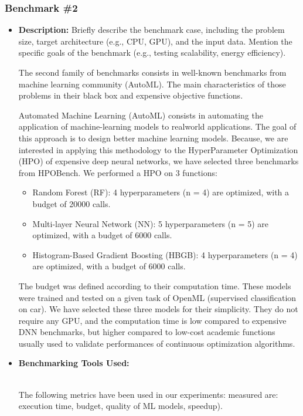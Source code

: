 \subsubsection{Benchmark \#2}
\begin{itemize}
\item \textbf{Description:} Briefly describe the benchmark case, including the problem size, target architecture (e.g., CPU, GPU), and the input data. Mention the specific goals of the benchmark (e.g., testing scalability, energy efficiency).

The second family of benchmarks consists in well-known benchmarks from machine learning community (AutoML). The main characteristics of those problems in their black box and expensive objective functions.

Automated Machine Learning (AutoML) consists in automating
the application of machine-learning models to realworld
applications. The goal of this approach is to design
better machine learning models. Because, we are interested
in applying this methodology to the HyperParameter Optimization
(HPO) of expensive deep neural networks, we
have selected three benchmarks from HPOBench. We
performed a HPO on 3 functions:
\begin{itemize}
\item Random Forest (RF): 4 hyperparameters (n = 4) are
optimized, with a budget of 20000 calls.
\item Multi-layer Neural Network (NN): 5 hyperparameters
(n = 5) are optimized, with a budget of 6000 calls.
\item Histogram-Based Gradient Boosting (HBGB): 4 hyperparameters
(n = 4) are optimized, with a budget of 6000 calls.
\end{itemize}

The budget was defined according to their computation time. These models were trained and tested on a given task of OpenML (supervised classification on car). We have selected these three models for their simplicity. They do not require any GPU, and the computation time is low compared to expensive DNN benchmarks, but higher compared to low-cost academic functions usually used to
validate performances of continuous optimization algorithms.

\item \textbf{Benchmarking Tools Used:} 

 \\

The following metrics have been used in our experiments:  measured are: execution time, budget, quality of ML models, speedup).


\end{itemize}

